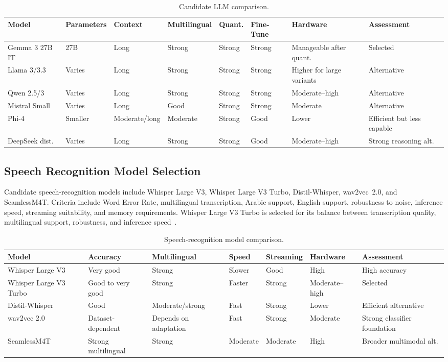 \documentclass[12pt,a4paper,oneside,openany]{report}
\begin{document}
\begin{table}[H]
\centering\small
\caption{Candidate LLM comparison.}
\label{tab:llm}
\begin{tabular}{@{}llllllll@{}}
\toprule
Model & Parameters & Context & Multilingual & Quant. & Fine-Tune & Hardware & Assessment \\
\midrule
Gemma 3 27B IT & 27B & Long & Strong & Strong & Strong & Manageable after quant. & Selected \\
Llama 3/3.3 & Varies & Long & Strong & Strong & Strong & Higher for large variants & Alternative \\
Qwen 2.5/3 & Varies & Long & Strong & Strong & Strong & Moderate--high & Alternative \\
Mistral Small & Varies & Long & Good & Strong & Strong & Moderate & Alternative \\
Phi-4 & Smaller & Moderate/long & Moderate & Strong & Good & Lower & Efficient but less capable \\
DeepSeek dist. & Varies & Long & Strong & Strong & Good & Moderate--high & Strong reasoning alt. \\
\bottomrule
\end{tabular}
\end{table}

\subsection{Speech Recognition Model Selection}

Candidate speech-recognition models include Whisper Large V3, Whisper Large V3 Turbo, Distil-Whisper, wav2vec~2.0, and SeamlessM4T. Criteria include Word Error Rate, multilingual transcription, Arabic support, English support, robustness to noise, inference speed, streaming suitability, and memory requirements. Whisper Large V3 Turbo is selected for its balance between transcription quality, multilingual support, robustness, and inference speed~\cite{radford2022whisper}.

\begin{table}[H]
\centering\small
\caption{Speech-recognition model comparison.}
\label{tab:asr}
\begin{tabular}{@{}lllllll@{}}
\toprule
Model & Accuracy & Multilingual & Speed & Streaming & Hardware & Assessment \\
\midrule
Whisper Large V3 & Very good & Strong & Slower & Good & High & High accuracy \\
Whisper Large V3 Turbo & Good to very good & Strong & Faster & Strong & Moderate--high & Selected \\
Distil-Whisper & Good & Moderate/strong & Fast & Strong & Lower & Efficient alternative \\
wav2vec 2.0 & Dataset-dependent & Depends on adaptation & Fast & Strong & Moderate & Strong classifier foundation \\
SeamlessM4T & Strong multilingual & Strong & Moderate & Moderate & High & Broader multimodal alt. \\
\bottomrule
\end{tabular}
\end{table}
\end{document}
